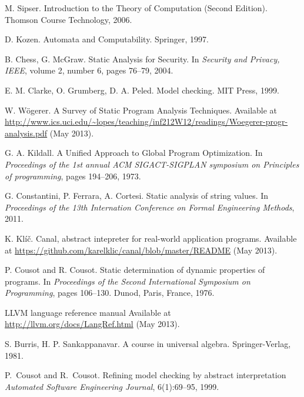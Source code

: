\documentclass[12pt,final,oneside]{fithesis2}
\theoremstyle{definition}
\begin{document}
\begin{thebibliography}{99}
M{.} Sipser.
\newblock Introduction to the Theory of Computation (Second Edition).
\newblock Thomson Course Technology, 2006.

D{.} Kozen.
\newblock Automata and Computability.
\newblock Springer, 1997.

B{.} Chess, G{.} McGraw.
\newblock Static Analysis for Security.
\newblock In \emph{Security and Privacy, IEEE}, volume 2, number 6,
  pages 76--79, 2004.

E{.} M{.} Clarke, O{.} Grumberg, D{.} A{.} Peled.
\newblock Model checking.
\newblock MIT Press, 1999.

W{.} W\"{o}gerer.
\newblock A Survey of Static Program Analysis Techniques.
\newblock Available at \url{http://www.ics.uci.edu/~lopes/teaching/inf212W12/readings/Woegerer-progr-analysis.pdf}
  (May 2013).

G{.} A{.} Kildall.
\newblock A Unified Approach to Global Program Optimization.
\newblock In \emph{Proceedings of the 1st annual ACM SIGACT-SIGPLAN
  symposium on Principles of programming}, pages 194--206, 1973.

G{.} Constantini, P{.} Ferrara, A{.} Cortesi.
\newblock Static analysis of string values.
\newblock In \emph{Proceedings of the 13th Internation Conference on Formal
  Engineering Methods}, 2011.

K{.} Klíč.
\newblock Canal, abstract intepreter for real-world application programs.
\newblock Available at \url{https://github.com/karelklic/canal/blob/master/README}
  (May 2013).

P{.} Cousot and R{.} Cousot.
\newblock Static determination of dynamic properties of programs.
\newblock In {\em Proceedings of the Second International Symposium on
  Programming}, pages 106--130. Dunod, Paris, France, 1976.

\newblock LLVM language reference manual
\newblock Available at \url{http://llvm.org/docs/LangRef.html} (May 2013).

S{.} Burris, H{.} P{.} Sankappanavar.
\newblock A course in universal algebra.
\newblock Springer-Verlag, 1981.

P.~Cousot and R.~Cousot.
\newblock Refining model checking by abstract interpretation
\newblock \emph{Automated Software Engineering Journal}, 6(1):69--95, 1999.


\end{thebibliography}
\end{document}
